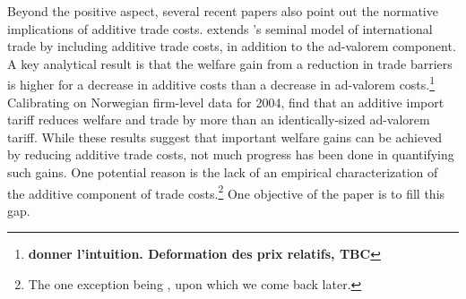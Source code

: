 \documentclass[a4paper,11pt]{article}
\begin{document}
Beyond the positive aspect, several recent papers also point out the normative implications of additive trade costs. \citet{sorensen2014} extends \citet{melitz}'s seminal model of international trade by including additive trade costs, in addition to the ad-valorem component. A key analytical result is that the welfare gain from a reduction in trade barriers is higher for a decrease in additive costs than a decrease in ad-valorem costs.\footnote{\textbf{donner l'intuition. Deformation des prix relatifs, TBC}} Calibrating on Norwegian firm-level data for 2004, \citet{Irrazabal_2015} find that an additive import tariff reduces welfare and trade by more than an identically-sized ad-valorem tariff. While these results suggest that important welfare gains can be achieved by reducing additive trade costs, not much progress has been done in quantifying such gains. One potential reason is the lack of an empirical characterization of the additive component of trade costs.\footnote{The one exception being \citet{Irrazabal_2015}, upon which we come back later.} One objective of the paper is to fill this gap. \bigskip
\end{document}
